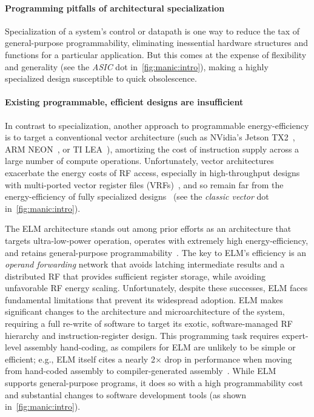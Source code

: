 \paragraph{Programming pitfalls of architectural specialization}
Specialization of a system's control or datapath is one way to reduce the tax of general-purpose programmability, eliminating inessential hardware structures and functions for a particular application.
% 
But this comes at the expense of flexibility and generality (see the \textit{ASIC} dot in~\autoref{fig:manic:intro}), making a highly specialized design susceptible to quick obsolescence.

\paragraph{Existing programmable, efficient designs are insufficient}
In contrast to specialization, another approach to programmable
energy-efficiency is to target a conventional vector architecture (such as
NVidia's Jetson TX2~\cite{jetsontx2}, ARM NEON~\cite{neon}, or TI LEA~\cite{lea}), amortizing the cost of instruction
supply across a large number of compute operations. Unfortunately,
vector architectures exacerbate the energy costs of RF access,
especially in high-throughput designs with multi-ported vector register files (VRFs)~\cite{kozyrakis2003overcoming,asanovic1996t0,iram},
and so remain far from the energy-efficiency of fully specialized designs~\cite{hameed2010understanding} (see the \textit{classic vector} dot in~\autoref{fig:manic:intro}).

The ELM architecture stands out among prior efforts as an architecture that
targets ultra-low-power operation, operates with extremely high
energy-efficiency, and retains general-purpose
programmability~\cite{balfour_elm_thesis,balfour2008energy}.
%
The key to ELM's efficiency is an \emph{operand forwarding} network that avoids
latching intermediate results and a distributed RF that provides
sufficient register storage, while avoiding unfavorable RF energy scaling. 
%
Unfortunately, despite these successes, ELM faces fundamental limitations that prevent its
widespread adoption.
%
ELM makes significant changes to the architecture and microarchitecture of the
system, requiring a full re-write of software to target its exotic,
software-managed RF hierarchy and instruction-register design.  This programming task
requires expert-level assembly hand-coding,
as compilers for ELM are unlikely to be simple or efficient;
e.g., ELM itself cites a nearly 2$\times$ drop in performance when moving from hand-coded assembly to compiler-generated assembly~\cite{balfour2008energy}.
%
While ELM supports general-purpose programs, it does so with a high
programmability cost and substantial changes to software development tools (as shown in~\autoref{fig:manic:intro}).

